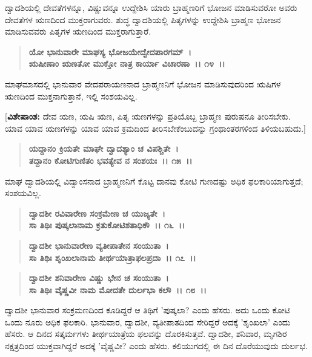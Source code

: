 ದ್ವಾದಶಿಯಲ್ಲಿ ದೇವತೆಗಳನ್ನೂ, ವಿಷ್ಣುವನ್ನೂ ಉದ್ದೇಶಿಸಿ ಯಾರು ಬ್ರಾಹ್ಮಣರಿಗೆ ಭೋಜನ ಮಾಡಿಸುವರೋ ಅವರು ದೇವತೆಗಳ ಋಣದಿಂದ ಮುಕ್ತರಾಗುವರು. ಶುದ್ಧ ದ್ವಾದಶಿಯಲ್ಲಿ ಪಿತೃಗಳನ್ನು ಉದ್ದೇಶಿಸಿ ಬ್ರಾಹ್ಮಣ ಭೋಜನ ಮಾಡಿಸುವವರು ಪಿತೃಗಳ ಋಣದಿಂದ ಮುಕ್ತ\-ರಾಗುತ್ತಾರೆ.

\begin{verse}
\textbf{ಯೋ ಭಾನುವಾರೇ ಮಾಘಸ್ಯ ಭೋಜಯೇದ್ವೇದಪಾರಗಮ್~।}\\\textbf{ಋಷೀಣಾಂ ಋಣತೋ ಮುಕ್ತೋ ನಾತ್ರ ಕಾರ್ಯಾ ವಿಚಾರಣಾ~।। ೧೪~।।}
\end{verse}

ಮಾಘಮಾಸದಲ್ಲಿ ಭಾನುವಾರ ವೇದಪರಾಯಣನಾದ ಬ್ರಾಹ್ಮಣನಿಗೆ ಭೋಜನ ಮಾಡಿಸುವುದರಿಂದ ಋಷಿಗಳ ಋಣದಿಂದ ಮುಕ್ತನಾಗುತ್ತಾನೆ, ಇಲ್ಲಿ ಸಂಶಯವಿಲ್ಲ.

[\textbf{ವಿಶೇಷಾಂಶ:} ದೇವ ಋಣ, ಋಷಿ ಋಣ, ಪಿತೃ ಋಣಗಳನ್ನು ಪ್ರತಿಯೊಬ್ಬ ಬ್ರಾಹ್ಮಣ ಪುರುಷನೂ ತೀರಿಸಬೇಕು. ಯಾವ ಯಾವ ಋಣಗಳನ್ನು ಯಾವ ಯಾವ ಕ್ರಮದಿಂದ ತೀರಿಸಬೇಕೆಂಬುದನ್ನು ಗ್ರಂಥಾಂತರಗಳಿಂದ ತಿಳಿಯಬಹುದು.]

\begin{verse}
\textbf{ಯದ್ದಾನಂ ಕ್ರಿಯತೇ ಮಾಘೇ ದ್ವಾದಶ್ಯಾಂ ಚ ವಿಪಶ್ಚಿತೇ~।}\\\textbf{ತದ್ದಾನಂ ಕೋಟಿಗುಣಿತಂ ಭವತ್ಯೇವ ನ ಸಂಶಯಃ~।। ೧೫~।।}
\end{verse}

ಮಾಘ ದ್ವಾದಶಿಯಲ್ಲಿ ವಿದ್ವಾಂಸನಾದ ಬ್ರಾಹ್ಮಣನಿಗೆ ಕೊಟ್ಟ ದಾನವು ಕೋಟಿ ಗುಣದಷ್ಟು ಅಧಿಕ ಫಲಕಾರಿಯಾಗುತ್ತದೆ; ಸಂಶಯವಿಲ್ಲ.

\begin{verse}
\textbf{ದ್ವಾದಶೀ ರವಿವಾರೇಣ ಸಂಕ್ರಮೇಣ ಚ ಯುಜ್ಯತೇ~।}\\\textbf{ಸಾ ತಿಥಿಃ ಪುಷ್ಕಲಾನಾಮ ಕ್ರತುಕೋಟಿಶತಾಧಿಕೌ~।। ೧೬~।।} 
\end{verse}

\begin{verse}
\textbf{ದ್ವಾದಶೀ ಭಾನುವಾರೇಣ ವ್ಯತೀಪಾತೇನ ಸಂಯುತಾ~।}\\\textbf{ಸಾ ತಿಥಿಃ ಶೃಂಖಲಾನಾಮ ತೀರ್ಥಯಾತ್ರಾಫಲಪ್ರದಾ~।। ೧೭~।। }
\end{verse}

\begin{verse}
\textbf{ದ್ವಾದಶೀ ಶನಿವಾರೇಣ ವಿಷ್ಣು ಭೇನ ಚ ಸಂಯುತಾ~।}\\\textbf{ಸಾ ತಿಥಿಃ ವೈಷ್ಣವೀ ನಾಮ ಮೋದತೇ ದುರ್ಲಭಾ ಕಲೌ~।। ೧೮~।।}
\end{verse}

ದ್ವಾದಶೀ ಭಾನುವಾರ ಸಂಕ್ರಮಣದಿಂದ ಕೂಡಿದ್ದರೆ ಆ ತಿಥಿಗೆ 'ಪುಷ್ಕಲಾ? ಎಂದು ಹೆಸರು. ಅದು ಒಂದು ಕೋಟಿ ಒಂದು ನೂರು ಅಧಿಕ ಫಲಕಾರಿ. ಭಾನುವಾರ, ದ್ವಾದಶೀ, ವ್ಯತೀಪಾತದಿಂದ ಸೇರಿದ್ದರೆ ಅದಕ್ಕೆ 'ಶೃಂಖಲಾ' ಎಂದು ಹೆಸರು. ಆ ದಿನದ ಸತ್ಕರ್ಮಗಳು ತೀರ್ಥಯಾತ್ರೆಯ ಫಲವನ್ನು ದೊರಕಿಸುತ್ತವೆ. ದ್ವಾದಶೀ, ಶನಿವಾರ, ಮೃಗಶಿರ ನಕ್ಷತ್ರದಿಂದ ಯುಕ್ತವಾಗಿದ್ದರೆ ಅದಕ್ಕೆ 'ವೈಷ್ಣವೀ? ಎಂದು ಹೆಸರು. ಕಲಿಯುಗದಲ್ಲಿ ಈ ದಿನ ದೊರೆಯುವುದು ದುರ್ಲಭ.

